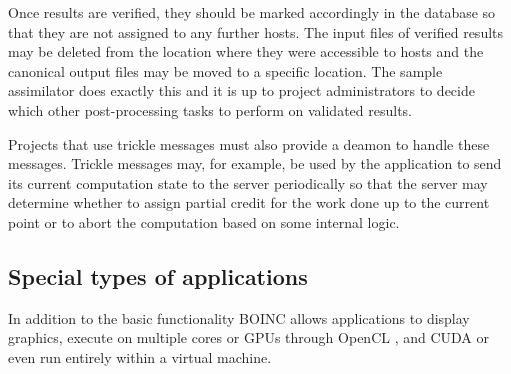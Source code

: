 Once results are verified, they should be marked accordingly in the database so that they are not assigned to any further hosts. The input files of verified results may be deleted from the location where they were accessible to hosts and the canonical output files may be moved to a specific location.
The sample assimilator does exactly this and it is up to project administrators to decide which other post-processing tasks to perform on validated results.

Projects that use   trickle messages must also provide a deamon to handle these messages. Trickle messages may, for example, be used by the application to  send its current computation state to the server periodically  so that the server may   determine whether to assign partial credit for the work done up to the current point  or   to abort the computation based on some internal logic.

\subsection{Special types of applications} \label{Btypes}
In addition to the basic functionality BOINC allows applications to display graphics, execute on multiple cores or GPUs through OpenCL \cite{opencl}, and CUDA \cite{cuda} or even run entirely within a virtual machine. 
